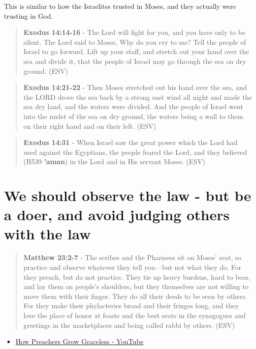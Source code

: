 \documentclass[11pt]{article}
\begin{document}
This is similar to how the Israelites trusted in Moses, and they actually were trusting in God.

\begin{quote}
\textbf{Exodus 14:14-16} - The Lord will fight for you, and you have only to be silent.  The Lord said to Moses, Why do you cry to me? Tell the people of Israel to go forward.  Lift up your staff, and stretch out your hand over the sea and divide it, that the people of Israel may go through the sea on dry ground. (ESV)
\end{quote}

\begin{quote}
\textbf{Exodus 14:21-22} - Then Moses stretched out his hand over the sea, and the LORD drove the sea back by a strong east wind all night and made the sea dry land, and the waters were divided. And the people of Israel went into the midst of the sea on dry ground, the waters being a wall to them on their right hand and on their left. (ESV)
\end{quote}

\begin{quote}
\textbf{Exodus 14:31} - When Israel saw the great power which the Lord had used against the Egyptians, the people feared the Lord, and they believed (H539 \textbf{'aman}) in the Lord and in His servant Moses. (ESV)
\end{quote}

\section{We should observe the law - but be a doer, and avoid judging others with the law}
\label{sec:org21f968e}
\begin{quote}
\textbf{Matthew 23:2-7} - The scribes and the Pharisees sit on Moses' seat, so practice and observe whatever they tell you—but not what they do. For they preach, but do not practice. They tie up heavy burdens, hard to bear, and lay them on people's shoulders, but they themselves are not willing to move them with their finger. They do all their deeds to be seen by others. For they make their phylacteries broad and their fringes long, and they love the place of honor at feasts and the best seats in the synagogues and greetings in the marketplaces and being called rabbi by others. (ESV)
\end{quote}

\begin{itemize}
\item \href{https://www.youtube.com/watch?v=alOI2zxIPgc}{How Preachers Grow Graceless - YouTube}
\end{itemize}
\end{document}
